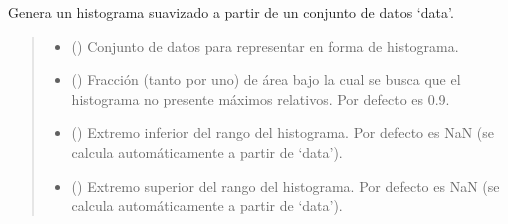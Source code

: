 \documentclass[letterpaper,10pt,english]{sphinxmanual}
\begin{document}

\begin{fulllineitems}
\label{\detokenize{utils.stats:utils.stats.get_hist_smooth}}
\pysigstartsignatures
{}
\pysigstopsignatures
\sphinxAtStartPar
Genera un histograma suavizado a partir de un conjunto de datos ‘data’.
\begin{quote}\begin{description}
\begin{itemize}
\item {} 
\sphinxAtStartPar
{} () \textendash{} Conjunto de datos para representar en forma de histograma.

\item {} 
\sphinxAtStartPar
{} (\sphinxstyleliteralemphasis{\sphinxupquote{, }}) \textendash{} Fracción (tanto por uno) de área bajo la cual se busca que el histograma no presente máximos relativos.
Por defecto es 0.9.

\item {} 
\sphinxAtStartPar
{} (\sphinxstyleliteralemphasis{\sphinxupquote{, }}) \textendash{} Extremo inferior del rango del histograma. Por defecto es NaN (se calcula automáticamente a partir de ‘data’).

\item {} 
\sphinxAtStartPar
{} (\sphinxstyleliteralemphasis{\sphinxupquote{, }}) \textendash{} Extremo superior del rango del histograma. Por defecto es NaN (se calcula automáticamente a partir de ‘data’).


\end{itemize}
\end{description}
\end{quote}
\end{fulllineitems}
\end{document}
